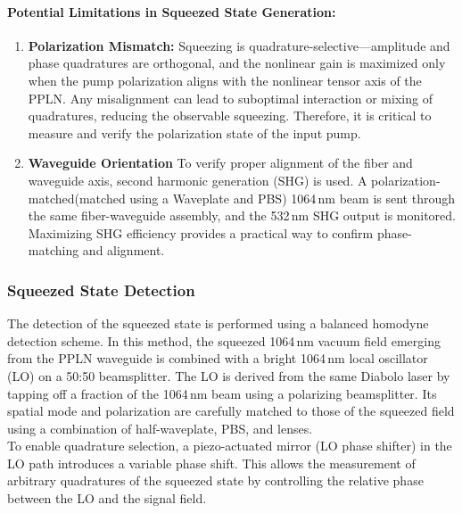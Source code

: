 \documentclass[colorlinks=true,pdfstartview=FitV,linkcolor=blue,
citecolor=red,urlcolor=magenta]{ligodoc}
\begin{document}
\paragraph{Potential Limitations in Squeezed State Generation:}
\begin{enumerate}
    \item \textbf{Polarization Mismatch:} Squeezing is quadrature-selective—amplitude and phase quadratures are orthogonal, and the nonlinear gain is maximized only when the pump polarization aligns with the nonlinear tensor axis of the PPLN. Any misalignment can lead to suboptimal interaction or mixing of quadratures, reducing the observable squeezing. Therefore, it is critical to measure and verify the polarization state of the input pump.
    
    \item \textbf{Waveguide Orientation} To verify proper alignment of the fiber and waveguide axis, second harmonic generation (SHG) is used. A polarization-matched(matched using a Waveplate and PBS) 1064\,nm beam is sent through the same fiber-waveguide assembly, and the 532\,nm SHG output is monitored. Maximizing SHG efficiency provides a practical way to confirm phase-matching and alignment. 
\end{enumerate}

\vspace{0.5em}

\subsubsection{Squeezed State Detection}

The detection of the squeezed state is performed using a balanced homodyne detection scheme. In this method, the squeezed 1064\,nm vacuum field emerging from the PPLN waveguide is combined with a bright 1064\,nm local oscillator (LO) on a 50:50 beamsplitter. The LO is derived from the same Diabolo laser by tapping off a fraction of the 1064\,nm beam using a polarizing beamsplitter. Its spatial mode and polarization are carefully matched to those of the squeezed field using a combination of half-waveplate, PBS, and lenses.\\

To enable quadrature selection, a piezo-actuated mirror (LO phase shifter) in the LO path introduces a variable phase shift. This allows the measurement of arbitrary quadratures of the squeezed state by controlling the relative phase between the LO and the signal field.\\
\end{document}
